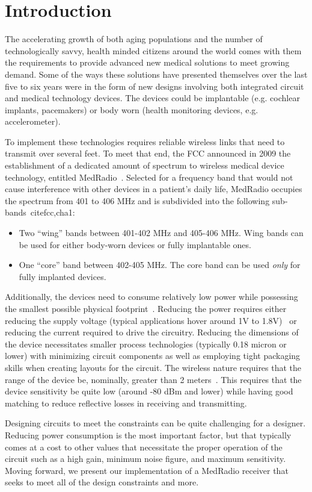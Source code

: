 \section{Introduction}
The accelerating growth of both aging populations and the number of technologically savvy, health minded citizens around the world comes with them the requirements to provide advanced new medical solutions to meet growing demand. Some of the ways these solutions have presented themselves over the last five to six years were in the form of new designs involving both integrated circuit and medical technology devices. The devices could be implantable (e.g. cochlear implants, pacemakers) or body worn (health monitoring devices, e.g. accelerometer). 

To implement these technologies requires reliable wireless links that need to transmit over several feet. To meet that end, the FCC announced in 2009 the establishment of a dedicated amount of spectrum to wireless medical device technology, entitled MedRadio~\cite{fcc}. Selected for a frequency band that would not cause interference with other devices in a patient's daily life, MedRadio occupies the spectrum from 401 to 406 MHz and is subdivided into the following sub-bands~cite{fcc,cha1}:
\begin{itemize}
	\item Two ``wing'' bands between 401-402 MHz and 405-406 MHz. Wing bands can be used for either body-worn devices or fully implantable ones.
	\item One ``core'' band between 402-405 MHz. The core band can be used \emph{only} for fully implanted devices.
\end{itemize}

Additionally, the devices need to consume relatively low power while possessing the smallest possible physical footprint~\cite{Bradley}. Reducing the power requires either reducing the supply voltage (typical applications hover around 1V to 1.8V)~\cite{Bradley} or reducing the current required to drive the circuitry. Reducing the dimensions of the device necessitates smaller process technologies (typically 0.18 micron or lower) with minimizing circuit components as well as employing tight packaging skills when creating layouts for the circuit. The wireless nature requires that the range of the device be, nominally, greater than 2 meters~\cite{Bradley}. This requires that the device sensitivity be quite low (around -80 dBm and lower) while having good matching to reduce reflective losses in receiving and transmitting.

Designing circuits to meet the constraints can be quite challenging for a designer. Reducing power consumption is the most important factor, but that typically comes at a cost to other values that necessitate the proper operation of the circuit such as a high gain, minimum noise figure, and maximum sensitivity. Moving forward, we present our implementation of a MedRadio receiver that seeks to meet all of the design constraints and more.
